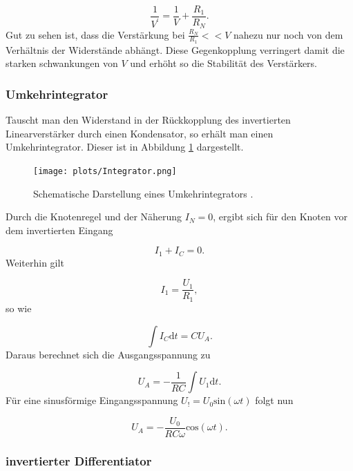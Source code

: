 \begin{equation}
    \frac{1}{V^{'}} = \frac{1}{V} + \frac{R_1}{R_N}.
\end{equation}
Gut zu sehen ist, dass die Verstärkung bei $\frac{R_N}{R_1} << V$ nahezu nur noch von dem Verhältnis der Widerstände abhängt.
Diese Gegenkopplung verringert damit die starken schwankungen von $V$ und erhöht so die Stabilität des Verstärkers.



\subsubsection{Umkehrintegrator}
\label{sec:Umkehrintegrator}

Tauscht man den Widerstand in der Rückkopplung des invertierten Linearverstärker durch einen Kondensator, so erhält man einen Umkehrintegrator.
Dieser ist in Abbildung \ref{fig:3} dargestellt.

\begin{figure}
    \centering
        \texttt{[image: plots/Integrator.png]}
    \caption{Schematische Darstellung eines Umkehrintegrators \cite{Anleitung}.}
    \label{fig:3}
\end{figure}

Durch die Knotenregel und der Näherung $I_N = 0$, ergibt sich für den Knoten vor dem invertierten Eingang

\begin{equation}
    I_1 + I_C = 0.
\end{equation}
Weiterhin gilt

\begin{equation}
    I_1 = \frac{U_1}{R_1},
\end{equation}
so wie

\begin{equation}
    \int I_C \text{d}t = C U_A.
\end{equation}
Daraus berechnet sich die Ausgangsspannung zu 

\begin{equation}
    U_A = -\frac{1}{R C} \int U_1 \text{d}t.
\end{equation}
Für eine sinusförmige Eingangsspannung $U_! = U_0 \text{sin}(\omega t)$ folgt nun

\begin{equation}
    U_A = - \frac{U_0}{R C \omega} \text{cos}(\omega t).
\end{equation}



\subsubsection{invertierter Differentiator}
\label{sec:Invertierter_Differentiator}

